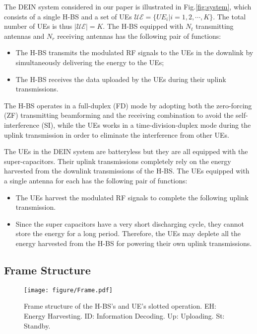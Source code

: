 \documentclass[12pt,draftcls,onecolumn,journal]{IEEEtran}
\begin{document}
The DEIN system considered in our paper is illustrated in Fig.\ref{fig:system}, which consists of a single H-BS and a set of UEs $\mathcal{UE}=\{UE_i | i =1,2,\cdots, K\}$. The total number of UEs is thus $|\mathcal{UE}| = K$. The H-BS equipped with $N_t$ transmitting antennas and $N_r$ receiving antennas has the following pair of functions:
\begin{itemize}
	\item The H-BS transmits the modulated RF signals to the UEs in the downlink by simultaneously delivering the energy to the UEs;
	\item The H-BS receives the data uploaded by the UEs during their uplink transmissions.
\end{itemize}
The H-BS operates in a full-duplex (FD) mode by adopting both the zero-forcing (ZF) transmitting beamforming and the receiving combination to avoid the self-interference (SI), while the UEs works in a time-division-duplex mode during the uplink transmission in order to eliminate the interference from other UEs. 

The UEs in the DEIN system are batteryless but they are all equipped with the super-capacitors. Their uplink transmissions completely rely on the energy harvested from the downlink transmissions of the H-BS. The UEs equipped with a single antenna for each has the following pair of functions:
\begin{itemize}
	\item The UEs harvest the modulated RF signals to complete the following uplink transmission. 
	\item Since the super capacitors have a very short discharging cycle, they cannot store the energy for a long period. Therefore, the UEs may deplete all the energy harvested from the H-BS for powering their own uplink transmissions.
\end{itemize}


\subsection{Frame Structure}


\begin{figure}
\centering
\texttt{[image: figure/Frame.pdf]}
\setlength{\abovecaptionskip}{0pt}
\setlength{\belowcaptionskip}{0pt} \caption{Frame structure of the H-BS's and UE's slotted operation. EH: Energy Harvesting. ID: Information Decoding. Up: Uploading. St: Standby.} \label{fig:Frame}
\end{figure}
\end{document}
